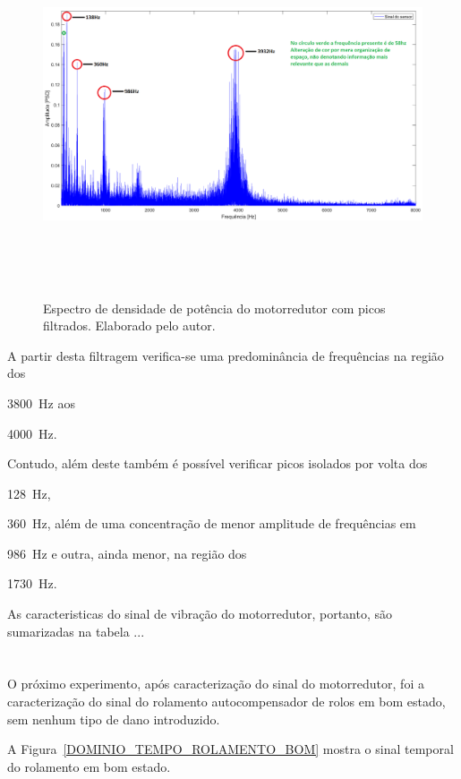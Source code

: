 \documentclass[
	12pt,				
	oneside,			
	a4paper,			
	english,			
	brazil,			
	]{abntex2ppgsi}
\begin{document}
{{{{{{{\begin{figure}[H]
\centering
\caption {Espectro de densidade de potência do motorredutor com picos filtrados. Elaborado pelo autor.}
\includegraphics[width=\textwidth,height=100mm,keepaspectratio]{GraficosAnalise/PSD_MOTORREDUTOR_FILTRADO_ANOTADO}
\label{PSD_MOTORREDUTOR_FILTRADO_ANOTADO}
\end{figure}

A partir desta filtragem verifica-se uma predominância de frequências na região dos {\SI{3800}{\hertz} aos {\SI{4000}{\hertz}. 

Contudo, além deste também é possível verificar picos isolados por volta dos {\SI{128}{\hertz}, {\SI{360}{\hertz}, além de uma concentração de menor amplitude de frequências em {\SI{986}{\hertz} e outra, ainda menor, na região dos {\SI{1730}{\hertz}. 

As caracteristicas do sinal de vibração do motorredutor, portanto, são sumarizadas na tabela ... 

\section{}



O próximo experimento, após caracterização do sinal do motorredutor, foi a caracterização do sinal do rolamento autocompensador de rolos em bom estado, sem nenhum tipo de dano introduzido. 

A Figura~\ref{DOMINIO_TEMPO_ROLAMENTO_BOM} mostra o sinal temporal do rolamento em bom estado. 

}}}}}}}}}}}}}
\end{document}
